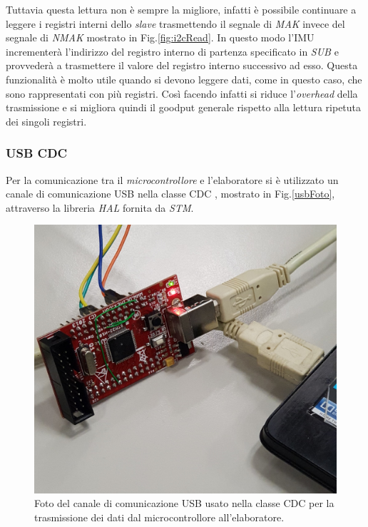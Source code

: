 Tuttavia questa lettura non è sempre la migliore, infatti è possibile continuare a leggere i registri interni dello \textit{slave} trasmettendo il segnale di \textit{MAK} invece del segnale di \textit{NMAK} mostrato in Fig.\ref{fig:i2cRead}. In questo modo l'IMU incrementerà l'indirizzo del registro interno di partenza specificato in \textit{SUB} e provvederà a trasmettere il valore del registro interno successivo ad esso. Questa funzionalità è molto utile quando si devono leggere dati, come in questo caso, che sono rappresentati con più registri. Così facendo infatti si riduce l'\textit{overhead} della trasmissione e si migliora quindi il goodput generale rispetto alla lettura ripetuta dei singoli registri.\\



\subsubsection{USB CDC}
\label{imp_usbcdc}
Per la comunicazione tra il \textit{microcontrollore} e l'elaboratore si è utilizzato un canale di comunicazione USB nella classe CDC \cite{usbCDC}, mostrato in Fig.\ref{usbFoto}, attraverso la libreria \textit{HAL} \cite{hal} fornita da \textit{STM}.
\begin{figure}[H]  
	\centering 
	\includegraphics[scale=0.1]{implementazione/usbFoto.jpg}
	\caption{Foto del canale di comunicazione USB usato nella classe CDC per la trasmissione dei dati dal microcontrollore all'elaboratore.}
	\label{fig:usbFoto}
\end{figure}
